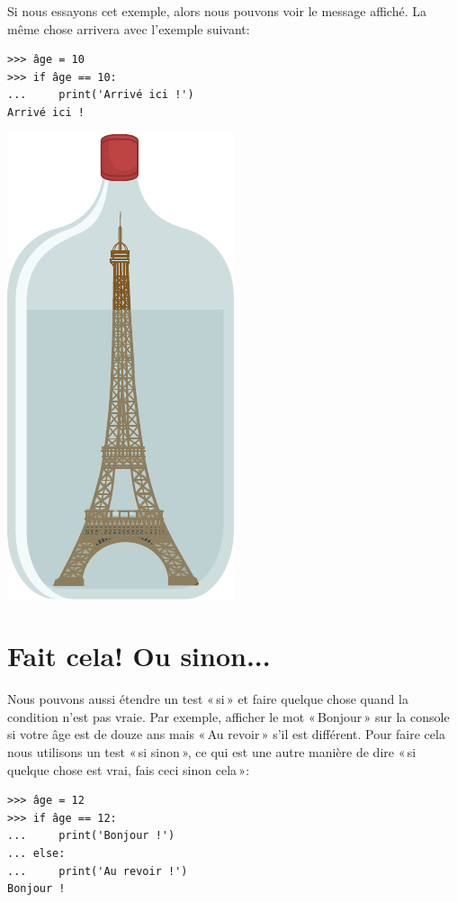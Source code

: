 Si nous essayons cet exemple, alors nous pouvons voir le message affiché. La même chose arrivera avec l'exemple suivant:

\begin{Verbatim}[frame=single,rulecolor=\color{green}, label=à taper avec attention]
>>> âge = 10
>>> if âge == 10:
...     print('Arrivé ici !')
Arrivé ici !
\end{Verbatim}

\begin{center}
\includegraphics[scale=1]{images/paris.pdf}
\end{center}

\section{Fait cela! Ou sinon...}

Nous pouvons aussi étendre un test « si » et faire quelque chose quand la condition n'est pas vraie. Par exemple, afficher le mot « Bonjour » sur la console si votre âge est de douze ans mais « Au revoir »  s'il est différent. Pour faire cela nous utilisons un test « si sinon », ce qui est une autre manière de dire « si quelque chose est vrai, fais ceci sinon cela »:

\begin{Verbatim}[frame=single,rulecolor=\color{green}, label=à taper avec attention]
>>> âge = 12
>>> if âge == 12:
...     print('Bonjour !')
... else:
...     print('Au revoir !')
Bonjour !
\end{Verbatim}

